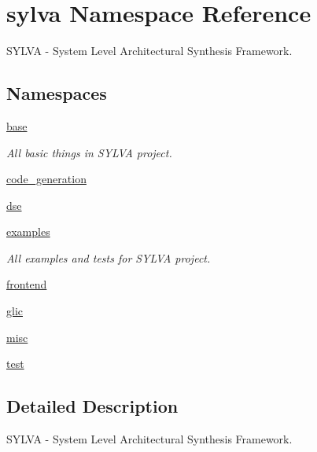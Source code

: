 \hypertarget{namespacesylva}{}\section{sylva Namespace Reference}
\label{namespacesylva}


S\+Y\+L\+VA -\/ System Level Architectural Synthesis Framework.  


\subsection*{Namespaces}
\begin{DoxyCompactItemize}
\item 
 \hyperlink{namespacesylva_1_1base}{base}
\begin{DoxyCompactList}\small\item\em All basic things in S\+Y\+L\+VA project. \end{DoxyCompactList}\item 
 \hyperlink{namespacesylva_1_1code__generation}{code\+\_\+generation}
\item 
 \hyperlink{namespacesylva_1_1dse}{dse}
\item 
 \hyperlink{namespacesylva_1_1examples}{examples}
\begin{DoxyCompactList}\small\item\em All examples and tests for S\+Y\+L\+VA project. \end{DoxyCompactList}\item 
 \hyperlink{namespacesylva_1_1frontend}{frontend}
\item 
 \hyperlink{namespacesylva_1_1glic}{glic}
\item 
 \hyperlink{namespacesylva_1_1misc}{misc}
\item 
 \hyperlink{namespacesylva_1_1test}{test}
\end{DoxyCompactItemize}


\subsection{Detailed Description}
S\+Y\+L\+VA -\/ System Level Architectural Synthesis Framework. 